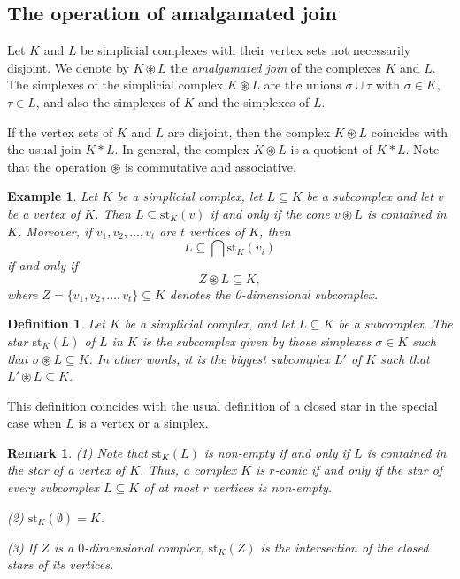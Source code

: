\documentclass[10pt,a4paper]{amsart}
\newtheorem{remark}[lema]{Remark}
\newtheorem{defi}[lema]{Definition}
\newtheorem{ej}[lema]{Example}
\newcommand{\st}{\textrm{st}}
\begin{document}
\subsection{The operation of amalgamated join} 
Let $K$ and $L$ be simplicial complexes with their vertex sets not necessarily disjoint. We denote by $K \circledast L$ the \textit{amalgamated join} of the complexes $K$ and $L$. The simplexes of the simplicial complex $K \circledast L$ are the unions $\sigma \cup \tau$ with $\sigma \in K$, $\tau \in L$, and also the simplexes of $K$ and the simplexes of $L$. 

If the vertex sets of $K$ and $L$ are disjoint, then the complex $K \circledast L$ coincides with the usual join $K *L$. 
In general, the complex $K\circledast L$ is a quotient of $K*L$. Note that the operation $\circledast$ is commutative and associative.

\begin{ej}\label{ex4}
Let $K$ be a simplicial complex, let $L\subseteq K$ be a subcomplex and let $v$ be a vertex of $K$. Then $L \subseteq \st_K (v)$ if and only if the cone $v\circledast L $ is contained in $K$. Moreover, if $v_1, v_2, \ldots, v_t$ are $t$ vertices of $K$, then $$L\subseteq \bigcap \st_K(v_i)$$ if and only if $$Z \circledast L \subseteq K,$$ where $Z=\{v_1,v_2,\ldots, v_t\}\subseteq K$ denotes the 0-dimensional subcomplex.
\end{ej}

\begin{defi}{\it 
Let $K$ be a simplicial complex, and let $L\subseteq K$ be a subcomplex. The \textit{star} $\st_K(L)$ of $L$ in $K$ is the subcomplex given by those simplexes $\sigma \in K$ such that $\sigma \circledast L\subseteq K$. In other words, it is the biggest subcomplex $L'$ of $K$ such that $L'\circledast L\subseteq K$. 
}\end{defi}

This definition coincides with the usual definition of a closed star in the special case when $L$ is a vertex or a simplex. 

\begin{remark}{\rm 
(1) Note that $\st_K (L)$ is non-empty if and only if $L$ is contained in the star of a vertex of $K$. Thus, a complex $K$ is $r$-conic if and only if the star of every subcomplex $L\subseteq K$ of at most $r$ vertices is non-empty. 

(2) $\st_K(\emptyset)=K$. 

(3) If $Z$ is a $0$-dimensional complex, $\st_K(Z)$ is the intersection of the closed stars of its vertices.}
\end{remark}
\end{document}
